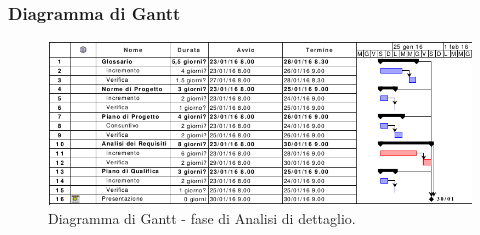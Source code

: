 \documentclass[a4paper]{article}
\begin{document}
			\subsubsection{Diagramma di Gantt}
				\begin{figure}[H]
					\centering
					\includegraphics[width=\textwidth]{gantt_dettaglio}
					\caption{Diagramma di Gantt - fase di Analisi di dettaglio.}
				\end{figure}
\end{document}
